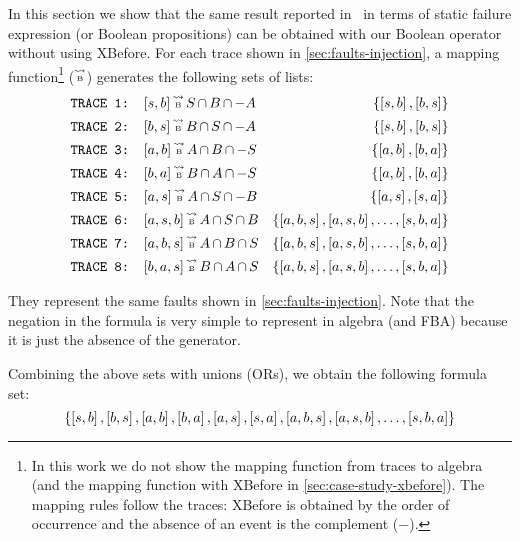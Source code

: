 \documentclass[12pt,openright,twoside,a4paper,oldfontcommands,english,brazil,final]{abntex2}
\theoremstyle{theo}
\def\tracetobool{\ensuremath\operatorname{\stackrel{\leadsto}{\text{\tiny B}}}}
\newcommand{\setsin}[1]{\ensuremath\left\{ #1 \right\}}
\newcommand{\listsin}[1]{\ensuremath\left[ #1 \right]}
\def\inter{\ensuremath\operatorname{\cap}}
\begin{document}
In this section we show that the same result reported in~\cite{DM2012} in terms of static failure expression (or Boolean propositions) can be obtained with our Boolean operator without using \ac{XBefore}.
For each trace shown in \cref{sec:faults-injection}, a mapping function\footnote{In this work we do not show the mapping function from traces to \ac{algebra} (and the mapping function with \ac{XBefore} in \cref{sec:case-study-xbefore}).
The mapping rules follow the traces: \ac{XBefore} is obtained by the order of occurrence and the absence of an event is the complement ($-$).} ($\tracetobool$) generates the following sets of lists:
%
\begin{align*}
\text{\texttt{TRACE 1: }}&[s,b] \tracetobool S \inter B \inter -A & \setsin{\listsin{s,b},\listsin{b,s}}\\
\text{\texttt{TRACE 2: }}&[b,s] \tracetobool B \inter S \inter -A & \setsin{\listsin{s,b},\listsin{b,s}}\\
\text{\texttt{TRACE 3: }}&[a,b] \tracetobool A \inter B \inter -S & \setsin{\listsin{a,b},\listsin{b,a}}\\
\text{\texttt{TRACE 4: }}&[b,a] \tracetobool B \inter A \inter -S & \setsin{\listsin{a,b},\listsin{b,a}}\\
\text{\texttt{TRACE 5: }}&[a,s] \tracetobool A \inter S \inter -B & \setsin{\listsin{a,s},\listsin{s,a}}\\
\text{\texttt{TRACE 6: }}&[a,s,b] \tracetobool A \inter S \inter B & \setsin{\listsin{a,b,s},\listsin{a,s,b},\ldots,\listsin{s,b,a}}\\
\text{\texttt{TRACE 7: }}&[a,b,s] \tracetobool A \inter B \inter S & \setsin{\listsin{a,b,s},\listsin{a,s,b},\ldots,\listsin{s,b,a}}\\
\text{\texttt{TRACE 8: }}&[b,a,s] \tracetobool B \inter A \inter S & \setsin{\listsin{a,b,s},\listsin{a,s,b},\ldots,\listsin{s,b,a}}\\
\end{align*}

They represent the same faults shown in \cref{sec:faults-injection}.
Note that the negation in the formula is very simple to represent in \ac{algebra} (and \ac{FBA}) because it is just the absence of the generator.

Combining the above sets with unions (ORs), we obtain the following formula set:
%
\[
\left\{ \listsin{s,b}, \listsin{b,s}, \listsin{a,b}, \listsin{b,a}, \listsin{a,s}, \listsin{s,a}, \listsin{a,b,s}, \listsin{a,s,b},\ldots,\listsin{s,b,a} \right\}
\]
\end{document}
